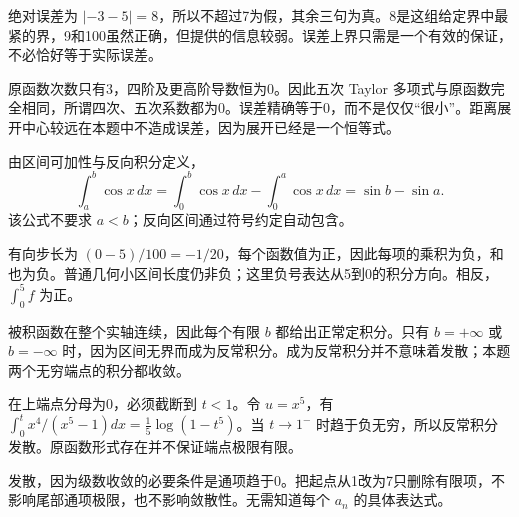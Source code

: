 \documentclass[12pt,fontset=fandol]{ctexart}
\begin{document}
\begin{solve}\label{ans:c45q5}
绝对误差为 $|-3-5|=8$，所以不超过7为假，其余三句为真。8是这组给定界中最紧的界，9和100虽然正确，但提供的信息较弱。误差上界只需是一个有效的保证，不必恰好等于实际误差。
\end{solve}

\begin{solve}\label{ans:c45q6}
原函数次数只有3，四阶及更高阶导数恒为0。因此五次 Taylor 多项式与原函数完全相同，所谓四次、五次系数都为0。误差精确等于0，而不是仅仅“很小”。距离展开中心较远在本题中不造成误差，因为展开已经是一个恒等式。
\end{solve}

\begin{solve}\label{ans:c45q7}
由区间可加性与反向积分定义，\[\int_a^b\cos x\,dx=\int_0^b\cos x\,dx-\int_0^a\cos x\,dx=\sin b-\sin a.\]该公式不要求 $a<b$；反向区间通过符号约定自动包含。
\end{solve}

\begin{solve}\label{ans:c45q8}
有向步长为 $(0-5)/100=-1/20$，每个函数值为正，因此每项的乘积为负，和也为负。普通几何小区间长度仍非负；这里负号表达从5到0的积分方向。相反，$\int_0^5f$ 为正。
\end{solve}

\begin{solve}\label{ans:c45q9}
被积函数在整个实轴连续，因此每个有限 $b$ 都给出正常定积分。只有 $b=+\infty$ 或 $b=-\infty$ 时，因为区间无界而成为反常积分。成为反常积分并不意味着发散；本题两个无穷端点的积分都收敛。
\end{solve}

\begin{solve}\label{ans:c45q10}
在上端点分母为0，必须截断到 $t<1$。令 $u=x^5$，有 $\int_0^t x^4/(x^5-1)dx=\frac15\log(1-t^5)$。当 $t\to1^-$ 时趋于负无穷，所以反常积分发散。原函数形式存在并不保证端点极限有限。
\end{solve}

\begin{solve}\label{ans:c45q11}
发散，因为级数收敛的必要条件是通项趋于0。把起点从1改为7只删除有限项，不影响尾部通项极限，也不影响敛散性。无需知道每个 $a_n$ 的具体表达式。
\end{solve}
\end{document}
